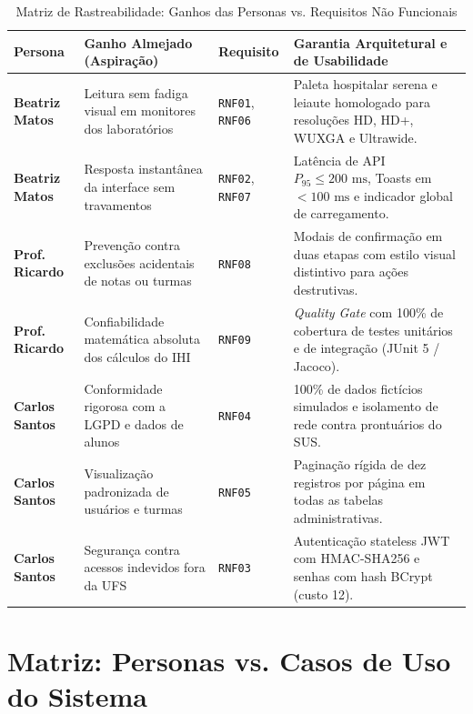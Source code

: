 \begin{table}[!ht]
\centering
\caption{Matriz de Rastreabilidade: Ganhos das Personas vs. Requisitos Não Funcionais}
\label{tab_rastreabilidade_ganhos_rnf}
\footnotesize
\begin{tabularx}{\textwidth}{p{2.6cm} p{4.6cm} p{1.6cm} X}
\toprule
\textbf{Persona} & \textbf{Ganho Almejado (Aspiração)} & \textbf{Requisito} & \textbf{Garantia Arquitetural e de Usabilidade} \\
\midrule
\textbf{Beatriz Matos} & Leitura sem fadiga visual em monitores dos laboratórios & \texttt{RNF01}, \texttt{RNF06} & Paleta hospitalar serena e leiaute homologado para resoluções HD, HD+, WUXGA e Ultrawide. \\
\addlinespace
\textbf{Beatriz Matos} & Resposta instantânea da interface sem travamentos & \texttt{RNF02}, \texttt{RNF07} & Latência de API $P_{95} \le 200\text{ ms}$, Toasts em $<100\text{ ms}$ e indicador global de carregamento. \\
\addlinespace
\textbf{Prof. Ricardo} & Prevenção contra exclusões acidentais de notas ou turmas & \texttt{RNF08} & Modais de confirmação em duas etapas com estilo visual distintivo para ações destrutivas. \\
\addlinespace
\textbf{Prof. Ricardo} & Confiabilidade matemática absoluta dos cálculos do IHI & \texttt{RNF09} & \textit{Quality Gate} com 100\% de cobertura de testes unitários e de integração (JUnit 5 / Jacoco). \\
\addlinespace
\textbf{Carlos Santos} & Conformidade rigorosa com a LGPD e dados de alunos & \texttt{RNF04} & 100\% de dados fictícios simulados e isolamento de rede contra prontuários do SUS. \\
\addlinespace
\textbf{Carlos Santos} & Visualização padronizada de usuários e turmas & \texttt{RNF05} & Paginação rígida de dez registros por página em todas as tabelas administrativas. \\
\addlinespace
\textbf{Carlos Santos} & Segurança contra acessos indevidos fora da UFS & \texttt{RNF03} & Autenticação stateless JWT com HMAC-SHA256 e senhas com hash BCrypt (custo 12). \\
\bottomrule
\end{tabularx}
\end{table}

\section{Matriz: Personas vs. Casos de Uso do Sistema}
\label{sec_matriz_personas_uc}

